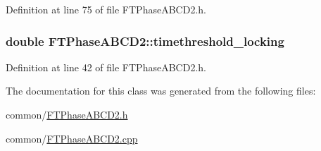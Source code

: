 Definition at line 75 of file FTPhaseABCD2.h.

\hypertarget{classFTPhaseABCD2_a9d54cd7a78d5372bf59e8a4aef3b200a}{
\subsubsection[{timethreshold\_\-locking}]{\setlength{\rightskip}{0pt plus 5cm}double {\bf FTPhaseABCD2::timethreshold\_\-locking}}}
\label{classFTPhaseABCD2_a9d54cd7a78d5372bf59e8a4aef3b200a}


Definition at line 42 of file FTPhaseABCD2.h.



The documentation for this class was generated from the following files:\begin{DoxyCompactItemize}
\item 
common/\hyperlink{FTPhaseABCD2_8h}{FTPhaseABCD2.h}\item 
common/\hyperlink{FTPhaseABCD2_8cpp}{FTPhaseABCD2.cpp}\end{DoxyCompactItemize}
